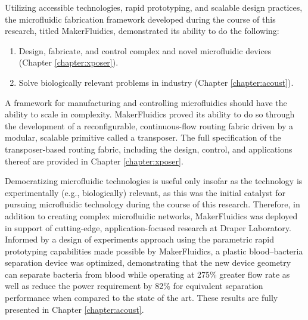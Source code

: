 Utilizing accessible technologies, rapid prototyping, and scalable design practices, the microfluidic fabrication framework developed during the course of this research, titled MakerFluidics, demonstrated its ability to do the following:
\begin{enumerate}
	\item Design, fabricate, and control complex and novel microfluidic devices (Chapter \ref{chapter:xposer}).
	\item Solve biologically relevant problems in industry (Chapter \ref{chapter:acoust}).
\end{enumerate}

A framework for manufacturing and controlling microfluidics should have the ability to scale in complexity. MakerFluidics proved its ability to do so through the development of a reconfigurable, continuous-flow routing fabric driven by a modular, scalable primitive called a transposer. The full specification of the transposer-based routing fabric, including the design, control, and applications thereof are provided in Chapter \ref{chapter:xposer}. 

Democratizing microfluidic technologies is useful only insofar as the technology is experimentally (e.g., biologically) relevant, as this was the initial catalyst for pursuing microfluidic technology during the course of this research. Therefore, in addition to creating complex microfluidic networks, MakerFluidics was deployed in support of cutting-edge, application-focused research at Draper Laboratory. Informed by a design of experiments approach using the parametric rapid prototyping capabilities made possible by MakerFluidics, a plastic blood--bacteria separation device was optimized, demonstrating that the new device geometry can separate bacteria from blood while operating at 275\% greater flow rate as well as reduce the power requirement by 82\% for equivalent separation performance when compared to the state of the art. These results are fully presented in Chapter \ref{chapter:acoust}.




